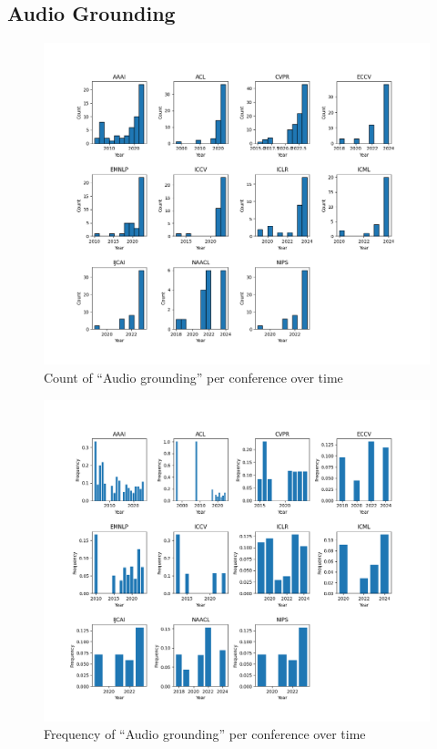 \documentclass[11pt]{article}
\begin{document}
\subsection{Audio Grounding}
\label{sec:appendix_word_sense_years_audio}
\begin{figure}[H]
  \includegraphics[width=0.75\columnwidth]{figs/grounding_figs/Audio/split_by_conf_grounding_dist.png}
  \centering
  \caption{Count of ``Audio grounding'' per conference over time}
  \label{fig:appendix_audio_all_confs_count}
\end{figure}

\begin{figure}[H]
  \includegraphics[width=0.75\columnwidth]{figs/freq_grounding_figs/Audio/split_by_conf_grounding_dist.png}
  \centering
  \caption{Frequency of ``Audio grounding'' per conference over time}
  \label{fig:appendix_audio_all_confs_freq}
\end{figure}
\end{document}
